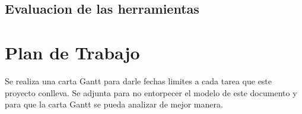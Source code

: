 \documentclass[12pt,journal,compsoc]{IEEEtran}
\begin{document}
\subsection{Evaluacion de las herramientas}
\section{Plan de Trabajo}
Se realiza una carta Gantt para darle fechas limites a cada tarea que este proyecto conlleva. Se adjunta para no entorpecer el modelo de este documento y para que la carta Gantt se pueda analizar de mejor manera.

%
%



%
%
\end{document}
